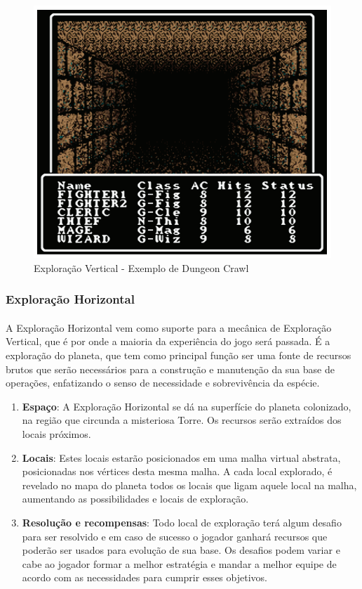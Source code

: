 \documentclass[11pt]{article} %
\begin{document}
\begin{figure}[!htp]
\centering
\includegraphics[scale=0.3]{res/Dungeon_Crawler.png}
\caption{Exploração Vertical - Exemplo de Dungeon Crawl}
\label{Exploração Vertical - Exemplo de Dungeon Crawl}
\end{figure}

\subsubsection{Exploração Horizontal}
\paragraph{}A Exploração Horizontal vem como suporte para a mecânica de Exploração Vertical, que é por onde a maioria da experiência do jogo será passada. É a exploração do planeta, que tem como principal função ser uma fonte de recursos brutos que serão necessários para a construção e manutenção da sua base de operações, enfatizando o senso de necessidade e sobrevivência da espécie.

\begin{enumerate}
  \item \textbf{Espaço}: A Exploração Horizontal se dá na superfície do planeta colonizado, na região que circunda a misteriosa Torre. Os recursos serão extraídos dos locais próximos.
  \item \textbf{Locais}: Estes locais estarão posicionados em uma malha virtual abstrata, posicionadas nos vértices desta mesma malha. A cada local explorado, é revelado no mapa do planeta todos os locais que ligam aquele local na malha, aumentando as possibilidades e locais de exploração.
  \item \textbf{Resolução e recompensas}: Todo local de exploração terá algum desafio para ser resolvido e em caso de sucesso o jogador ganhará recursos que poderão ser usados para evolução de sua base. Os desafios podem variar e cabe ao jogador formar a melhor estratégia e mandar a melhor equipe de acordo com as necessidades para cumprir esses objetivos.
\end{enumerate}
\end{document}
